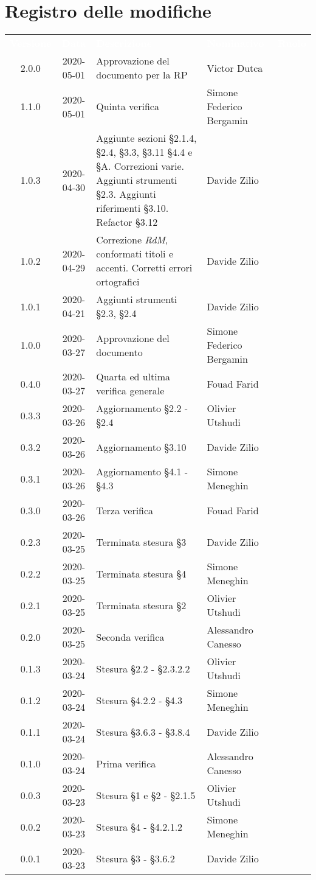 \section*{Registro delle modifiche}
{
	\centering
	\begin{longtable}{ c c  C{4cm}  C{3cm}  C{3.5cm} }
		\textcolor{white}{\textbf{Versione}} & \textcolor{white}{\textbf{Data}} & \textcolor{white}{\textbf{Descrizione}} & \textcolor{white}{\textbf{Nominativo}} & \textcolor{white}{\textbf{Ruolo}}\\
	2.0.0 & 2020-05-01 & Approvazione del documento per la RP & Victor Dutca &\Res{}\\
	1.1.0 & 2020-05-01 & Quinta verifica & Simone Federico Bergamin &\ver{}\\
	1.0.3 & 2020-04-30 & Aggiunte sezioni \S 2.1.4, \S 2.4, \S 3.3, \S 3.11 \S 4.4 e \S A. Correzioni varie. Aggiunti strumenti \S 2.3. Aggiunti riferimenti \S 3.10. Refactor \S 3.12 & Davide Zilio &\adm{} \\
	1.0.2 & 2020-04-29 & Correzione \textit{RdM}, conformati titoli e accenti. Corretti errori ortografici & Davide Zilio &\adm{} \\
	1.0.1 & 2020-04-21 & Aggiunti strumenti \S 2.3, \S 2.4 & Davide Zilio &\adm{} \\	
    1.0.0 & 2020-03-27 & Approvazione del documento & Simone Federico Bergamin &\Res{} \\
    	0.4.0 & 2020-03-27 & Quarta ed ultima verifica generale & Fouad Farid &\ver{}\\
    	0.3.3 & 2020-03-26 & Aggiornamento \S 2.2 - \S 2.4 & Olivier Utshudi &\adm{}\\
		0.3.2 & 2020-03-26 & Aggiornamento \S 3.10 & Davide Zilio &\adm{}\\
		0.3.1 & 2020-03-26 & Aggiornamento \S 4.1 - \S 4.3  & Simone Meneghin &\adm{}\\
		0.3.0 & 2020-03-26 & Terza verifica & Fouad Farid &\ver{}\\
		0.2.3 & 2020-03-25 & Terminata stesura \S 3  & Davide Zilio &\adm{}\\
    	0.2.2 & 2020-03-25 & Terminata stesura \S 4 & Simone Meneghin &\adm{}\\	
   		0.2.1 & 2020-03-25 & Terminata stesura \S 2 & Olivier Utshudi &\adm{}\\
   		0.2.0 & 2020-03-25 & Seconda verifica & Alessandro Canesso &\ver{}\\
		0.1.3 & 2020-03-24 & Stesura \S 2.2 - \S 2.3.2.2 & Olivier Utshudi &\adm{}\\
		0.1.2 & 2020-03-24 & Stesura \S 4.2.2 - \S 4.3 & Simone Meneghin &\adm{}\\		
		0.1.1 & 2020-03-24 & Stesura \S 3.6.3 - \S 3.8.4 & Davide Zilio &\adm{}\\
		0.1.0 & 2020-03-24 & Prima verifica & Alessandro Canesso &\ver{}\\
		0.0.3 & 2020-03-23 & Stesura \S 1 e \S 2 - \S 2.1.5 & Olivier Utshudi &\adm{}\\
		0.0.2 & 2020-03-23 & Stesura \S 4 - \S 4.2.1.2 & Simone Meneghin &\adm{}\\
		0.0.1 & 2020-03-23 & Stesura \S 3 - \S 3.6.2 & Davide Zilio &\adm{}\\		
	\end{longtable}
}